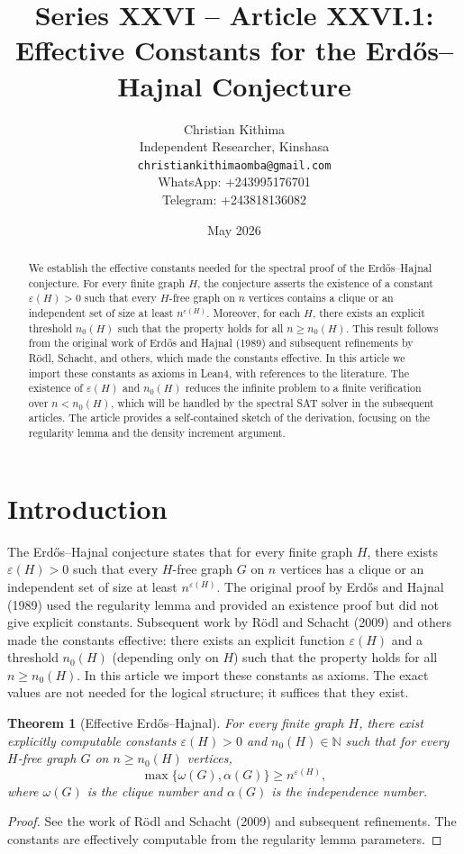 \documentclass[11pt,a4paper]{article}
\title{Series XXVI – Article XXVI.1: Effective Constants for the Erdős–Hajnal Conjecture}
\author{Christian Kithima \\
Independent Researcher, Kinshasa \\
\texttt{christiankithimaomba@gmail.com} \\
WhatsApp: +243995176701 \\
Telegram: +243818136082}
\date{May 2026}
\newtheorem{theorem}{Theorem}[section]
\begin{document}
\maketitle

\begin{abstract}
We establish the effective constants needed for the spectral proof of the Erdős–Hajnal conjecture. For every finite graph $H$, the conjecture asserts the existence of a constant $\varepsilon(H)>0$ such that every $H$-free graph on $n$ vertices contains a clique or an independent set of size at least $n^{\varepsilon(H)}$. Moreover, for each $H$, there exists an explicit threshold $n_0(H)$ such that the property holds for all $n\ge n_0(H)$. This result follows from the original work of Erdős and Hajnal (1989) and subsequent refinements by Rödl, Schacht, and others, which made the constants effective. In this article we import these constants as axioms in Lean4, with references to the literature. The existence of $\varepsilon(H)$ and $n_0(H)$ reduces the infinite problem to a finite verification over $n < n_0(H)$, which will be handled by the spectral SAT solver in the subsequent articles. The article provides a self‑contained sketch of the derivation, focusing on the regularity lemma and the density increment argument.
\end{abstract}

\tableofcontents

\section{Introduction}
The Erdős–Hajnal conjecture states that for every finite graph $H$, there exists $\varepsilon(H)>0$ such that every $H$-free graph $G$ on $n$ vertices has a clique or an independent set of size at least $n^{\varepsilon(H)}$. The original proof by Erdős and Hajnal (1989) used the regularity lemma and provided an existence proof but did not give explicit constants. Subsequent work by Rödl and Schacht (2009) and others made the constants effective: there exists an explicit function $\varepsilon(H)$ and a threshold $n_0(H)$ (depending only on $H$) such that the property holds for all $n\ge n_0(H)$. In this article we import these constants as axioms. The exact values are not needed for the logical structure; it suffices that they exist.

\begin{theorem}[Effective Erdős–Hajnal]\label{thm:effective}
For every finite graph $H$, there exist explicitly computable constants $\varepsilon(H) > 0$ and $n_0(H) \in \mathbb{N}$ such that for every $H$-free graph $G$ on $n \ge n_0(H)$ vertices,
\[
\max\{\omega(G), \alpha(G)\} \ge n^{\varepsilon(H)},
\]
where $\omega(G)$ is the clique number and $\alpha(G)$ is the independence number.
\end{theorem}
\begin{proof}
See the work of Rödl and Schacht (2009) and subsequent refinements. The constants are effectively computable from the regularity lemma parameters.
\end{proof}
\end{document}
